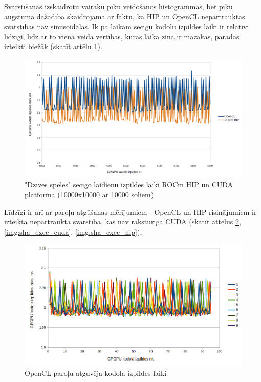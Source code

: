 Svārstīšanās izskaidrotu vairāku pīķu veidošanos histogrammās, bet pīķu
augstuma dažādība skaidrojama ar faktu, ka HIP un OpenCL nepārtrauktās
svārstības nav sinusoidālas. Ik pa laikam secīgu kodolu izpildes laiki ir
relatīvi līdzīgi, līdz ar to viena veida vērtības, kuras laika ziņā ir mazākas,
parādās izteikti biežāk (skatīt attēlu
\ref{img:consecutive_kernel_exec_gol_hip_cl_sample}).

\begin{figure}[H] \centering
    \includegraphics[width=\textwidth]{images/gol_hip_cl_sample_consecutive_runs_10k_by_10k_10ksteps.png}
    \caption{"Dzīves spēles" secīgo laidienu izpildes laiki ROCm HIP un CUDA
    platformā (10000x10000 ar 10000 soļiem)}
    \label{img:consecutive_kernel_exec_gol_hip_cl_sample}
\end{figure}

Līdzīgi ir arī ar paroļu atgūšanas mērījumiem - OpenCL un HIP risinājumiem ir
izteikta nepārtraukta svārstība, kas nav raksturīga CUDA (skatīt attēlus
\ref{img:sha_exec_cl}, \ref{img:sha_exec_cuda}, \ref{img:sha_exec_hip}).

\begin{figure}[H] \centering
    \includegraphics[width=\textwidth]{images/sha_kernel_exec_cl.png}
    \caption{OpenCL paroļu atguvēja kodola izpildes laiki}
    \label{img:sha_exec_cl}
\end{figure}

